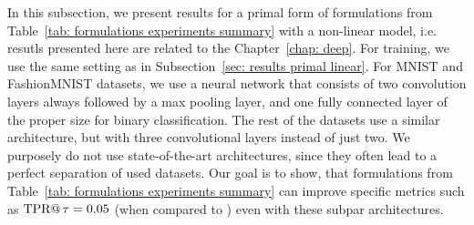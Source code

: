 In this subsection, we present results for a primal form of formulations from Table~\ref{tab: formulations experiments summary} with a non-linear model, i.e. resutls presented here are related to the Chapter~\ref{chap: deep}. For training, we use the same setting as in Subsection~\ref{sec: results primal linear}. For MNIST and FashionMNIST datasets, we use a neural network that consists of two convolution layers always followed by a max pooling layer, and one fully connected layer of the proper size for binary classification. The rest of the datasets use a similar architecture, but with three convolutional layers instead of just two. We purposely do not use state-of-the-art architectures, since they often lead to a perfect separation of used datasets. Our goal is to show, that formulations from Table~\ref{tab: formulations experiments summary} can improve specific metrics such as $\operatorname{TPR@}\tau = 0.05$ (when compared to \BaseLine) even with these subpar architectures.



